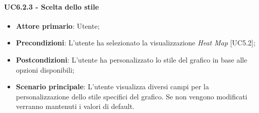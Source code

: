 \paragraph{UC6.2.3 - Scelta dello stile}
\begin{itemize}
	\item \textbf{Attore primario}: Utente;
	\item \textbf{Precondizioni}: L'utente ha selezionato la visualizzazione \textit{Heat Map} [UC5.2];
	\item \textbf{Postcondizioni}: L'utente ha personalizzato lo stile del grafico in base alle opzioni disponibili;
	
	\item \textbf{Scenario principale}: L'utente visualizza diversi campi per la personalizzazione dello stile specifici del grafico. Se non vengono modificati verranno mantenuti i valori di default. 
\end{itemize}